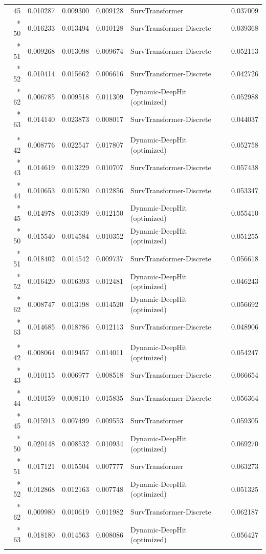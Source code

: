 \begin{longtable}{rrrrlr}
45 & 0.010287 & 0.009300 & 0.009128 & SurvTransformer & 0.037009 \\*
50 & 0.016233 & 0.013494 & 0.010128 & SurvTransformer-Discrete & 0.039368 \\*
51 & 0.009268 & 0.013098 & 0.009674 & SurvTransformer-Discrete & 0.052113 \\*
52 & 0.010414 & 0.015662 & 0.006616 & SurvTransformer-Discrete & 0.042726 \\*
62 & 0.006785 & 0.009518 & 0.011309 & Dynamic-DeepHit (optimized) & 0.052988 \\*
63 & 0.014140 & 0.023873 & 0.008017 & SurvTransformer-Discrete & 0.044037 \\
\addlinespace
\multicolumn{6}{l}{\textit{Landmark $L=23$}}\\*
42 & 0.008776 & 0.022547 & 0.017807 & Dynamic-DeepHit (optimized) & 0.052758 \\*
43 & 0.014619 & 0.013229 & 0.010707 & SurvTransformer-Discrete & 0.057438 \\*
44 & 0.010653 & 0.015780 & 0.012856 & SurvTransformer-Discrete & 0.053347 \\*
45 & 0.014978 & 0.013939 & 0.012150 & Dynamic-DeepHit (optimized) & 0.055410 \\*
50 & 0.015540 & 0.014584 & 0.010352 & Dynamic-DeepHit (optimized) & 0.051255 \\*
51 & 0.018402 & 0.014542 & 0.009737 & SurvTransformer-Discrete & 0.056618 \\*
52 & 0.016420 & 0.016393 & 0.012481 & Dynamic-DeepHit (optimized) & 0.046243 \\*
62 & 0.008747 & 0.013198 & 0.014520 & Dynamic-DeepHit (optimized) & 0.056692 \\*
63 & 0.014685 & 0.018786 & 0.012113 & SurvTransformer-Discrete & 0.048906 \\
\addlinespace
\multicolumn{6}{l}{\textit{Landmark $L=24$}}\\*
42 & 0.008064 & 0.019457 & 0.014011 & Dynamic-DeepHit (optimized) & 0.054247 \\*
43 & 0.010115 & 0.006977 & 0.008518 & SurvTransformer-Discrete & 0.066654 \\*
44 & 0.010159 & 0.008110 & 0.015835 & SurvTransformer-Discrete & 0.056364 \\*
45 & 0.015913 & 0.007499 & 0.009553 & SurvTransformer & 0.059305 \\*
50 & 0.020148 & 0.008532 & 0.010934 & Dynamic-DeepHit (optimized) & 0.069270 \\*
51 & 0.017121 & 0.015504 & 0.007777 & SurvTransformer & 0.063273 \\*
52 & 0.012868 & 0.012163 & 0.007748 & Dynamic-DeepHit (optimized) & 0.051325 \\*
62 & 0.009980 & 0.010619 & 0.011982 & SurvTransformer-Discrete & 0.062187 \\*
63 & 0.018180 & 0.014563 & 0.008086 & Dynamic-DeepHit (optimized) & 0.056427 \\
\addlinespace
\end{longtable}
\endgroup
